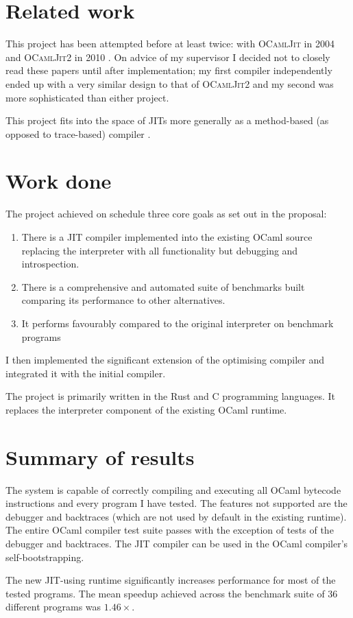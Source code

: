\section{Related work}

This project has been attempted before at least twice: with \textsc{OCamlJit} in 2004 \cite{ocjit1}
and \textsc{OCamlJit2} in 2010 \cite{ocjit2}. On advice of my supervisor I decided not to closely
read these papers until after implementation; my first compiler independently ended up with a very
similar design to that of \textsc{OCamlJit2} and my second was more sophisticated than either
project.

This project fits into the space of JITs more generally as a method-based (as opposed to
trace-based) compiler \cite{pyket}.
\section{Work done}

The project achieved on schedule three core goals as set out in the proposal:

\begin{enumerate}
      \item There is a JIT compiler implemented into the existing OCaml source
            replacing the interpreter with all functionality but debugging
            and introspection.
      \item There is a comprehensive and automated suite of benchmarks built
            comparing its performance to other alternatives.
      \item It performs favourably compared to the original interpreter on benchmark programs
\end{enumerate}

I then implemented the significant extension of the optimising compiler and integrated
it with the initial compiler.

The project is primarily written in the Rust and C programming languages. It replaces the
interpreter component of the existing OCaml runtime.

\section{Summary of results}

The system is capable of correctly compiling and executing all OCaml
bytecode instructions and every program I have tested. The features not supported are
the debugger and backtraces (which are not used by default in the existing runtime). The entire
OCaml compiler test suite passes with the exception of tests of
the debugger and backtraces. The JIT compiler can be used in the OCaml compiler's
self-bootstrapping.

The new JIT-using runtime significantly increases performance for most of the tested programs.
The mean speedup achieved across the benchmark suite of 36 different programs was $1.46 \times$.